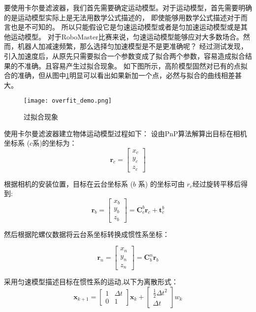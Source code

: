 要使用卡尔曼滤波器，我们首先需要确定运动模型。对于运动模型，首先需要明确的是运动模型实际上是无法用数学公式描述的，
即使能够用数学公式描述对于而言也是不可知的。 所以只能假设它是匀速运动模型或者是匀加速运动模型或是其他运动模型。
对于RoboMaster比赛来说，匀速运动模型能够应对大多数场合。然而，机器人加减速频繁，那么选择匀加速模型是不是更准确呢？ 
经过测试发现，引入加速度后，从原先只需要拟合一个参数变成了拟合两个参数，容易造成拟合结果的不准确。且容易产生过拟合现象。
如下图所示，高阶模型固然对已有的点拟合的准确，但从图中\ref{过拟合现象}明显可以看出如果新加一个点，必然与拟合的曲线相差甚大。
\begin{figure}[H]
    \centering
    \texttt{[image: overfit\_demo.png]} 
    \caption{过拟合现象} 
    \label{过拟合现象} 
\end{figure} 

使用卡尔曼滤波器建立物体运动模型过程如下：
设由PnP算法解算出目标在相机坐标系 ($c$系)的坐标为：
\begin{equation} \boldsymbol r_c=\left[\begin{array}{c} x_c\\ y_c\\ z_c \end{array}\right] \end{equation}
\par 
根据相机的安装位置，目标在云台坐标系 ($b$ 系) 的坐标可由 $r_c$经过旋转平移后得到:
\begin{equation} \boldsymbol r_b=\left[\begin{array}{c} x_b\\ y_b\\ z_b \end{array}\right] =\boldsymbol C_{c}^{b}\boldsymbol r_c + \boldsymbol t_{c}^{b} \end{equation}
\par 
然后根据陀螺仪数据将云台系坐标转换成惯性系坐标：


\begin{equation} \boldsymbol r_n=\left[\begin{array}{c} x_n\\ y_n\\ z_n \end{array}\right] =\boldsymbol C_{b}^{n}\boldsymbol r_b \end{equation}

\par
采用匀速模型描述目标在惯性系的运动,以下为离散形式：
\begin{equation} \boldsymbol x_{k+1} =\left[\begin{array}{cc} {1} & \Delta t  \\ 0 & {1}  \end{array}\right]\boldsymbol x_{k} + \left[\begin{array}{c} {\frac{1}{2}\Delta t^2} \\ {\Delta t}  \end{array}\right]w_k \end{equation}



